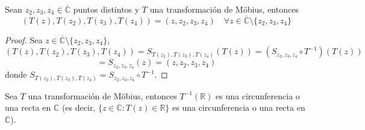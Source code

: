 \begin{teorema}
    Sean $z_2, z_3, z_4 \in \overline{\mathbb{C}}$ puntos distintos y $T$ una transformación de Möbius, entonces
    \[
        (T(z), T(z_2), T(z_3), T(z_4)) = (z, z_2, z_3, z_4) \quad \forall z \in \overline{\mathbb{C}} \setminus \{z_2, z_3, z_4\}
    \]
\end{teorema}

\begin{proof}
    Sea $z \in \overline{\mathbb{C}} \setminus \{z_2, z_3, z_4\}$,
    \[
        (T(z), T(z_2), T(z_3), T(z_4)) = S_{T(z_2), T(z_3), T(z_4)}(T(z)) = (S_{z_2, z_3, z_4} \circ T^{-1})(T(z))
    \]
    \[  
        = S_{z_2, z_3, z_4}(z) = (z, z_2, z_3, z_4)
    \]
    donde $S_{T(z_2), T(z_3), T(z_4)} = S_{z_2, z_3, z_4} \circ T^{-1}$.
\end{proof}

\begin{lema}
    Sea $T$ una transformación de Möbius, entonces $T^{-1}(\mathbb{R})$ es una circunferencia o una recta en $\mathbb{C}$ (es decir, $\{z \in \mathbb{C} : T(z) \in \mathbb{R}\}$ es una circunferencia o una recta en $\mathbb{C}$).
\end{lema}

